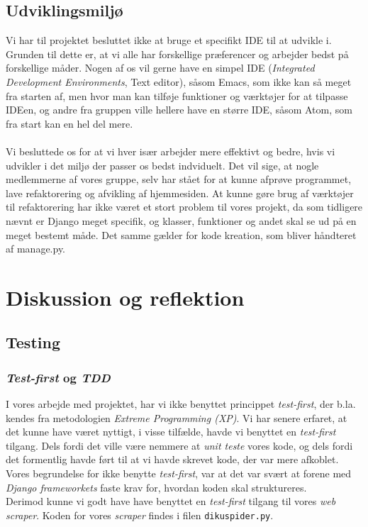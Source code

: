 \documentclass[12pt]{article}
\begin{document}
\subsection{Udviklingsmiljø}
Vi har til projektet besluttet ikke at bruge et specifikt IDE til at udvikle i. Grunden til dette er, at vi alle har forskellige præferencer og arbejder bedst på forskellige måder. Nogen af os vil gerne have en simpel IDE (\textit{Integrated Development Environments}, Text editor), såsom Emacs, som ikke kan så meget fra starten af, men hvor man kan tilføje funktioner og værktøjer for at tilpasse IDEen, og andre fra gruppen ville hellere have en større IDE, såsom Atom, som fra start kan en hel del mere. \\ \\
Vi besluttede os for at vi hver især arbejder mere effektivt og bedre, hvis vi udvikler i det miljø der passer os bedst indviduelt. Det vil sige, at nogle medlemmerne af vores gruppe, selv har stået for at kunne afprøve programmet, lave refaktorering og afvikling af hjemmesiden. At kunne gøre brug af værktøjer til refaktorering har ikke været et stort problem til vores projekt, da som tidligere nævnt er Django meget specifik, og klasser, funktioner og andet skal se ud på en meget bestemt måde. Det samme gælder for kode kreation, som bliver håndteret af manage.py.

\section{Diskussion og reflektion} %
\label{sec:diskussion}

\subsection{Testing}
\subsubsection{\textit{Test-first} og \textit{TDD}}
I vores arbejde med projektet, har vi ikke benyttet princippet \textit{test-first}, der b.la. kendes fra metodologien \textit{Extreme Programming (XP)}.
Vi har senere erfaret, at det kunne have været nyttigt, i visse tilfælde, havde vi benyttet en \textit{test-first} tilgang. Dels fordi det ville være nemmere at \textit{unit teste} vores kode, og dels fordi det formentlig havde ført til at vi havde skrevet kode, der var mere afkoblet. \\
Vores begrundelse for ikke benytte \textit{test-first}, var at det var svært at forene med \textit{Django frameworkets} faste krav for, hvordan koden skal struktureres. \\
Derimod kunne vi godt have have benyttet en \textit{test-first} tilgang til vores \textit{web scraper}. Koden for vores \textit{scraper} findes i filen \texttt{dikuspider.py}.
\end{document}
